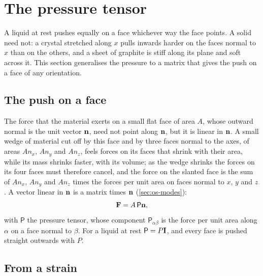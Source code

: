 \section{The pressure tensor}
\label{sec:pr-tensor}

A liquid at rest pushes equally on a face whichever way the face points.
A solid need not: a crystal stretched along $x$ pulls inwards harder on
the faces normal to $x$ than on the others, and a sheet of graphite is
stiff along its plane and soft across it. This section generalises the
pressure to a matrix that gives the push on a face of any orientation.

\subsection*{The push on a face}

The force that the material exerts on a small flat face of area $A$,
whose outward normal is the unit vector $\bm{\mathrm{n}}$, need not point along
$\bm{\mathrm{n}}$, but it is linear in $\bm{\mathrm{n}}$. A small wedge of material cut off
by this face and by three faces normal to the axes, of areas $An_x$,
$An_y$ and $An_z$, feels forces on its faces that shrink with their area,
while its mass shrinks faster, with its volume; as the wedge shrinks the
forces on its four faces must therefore cancel, and the force on the
slanted face is the sum of $An_x$, $An_y$ and $An_z$ times the forces per
unit area on faces normal to $x$, $y$ and $z$. A vector linear in $\bm{\mathrm{n}}$
is a matrix times $\bm{\mathrm{n}}$ (\cref{sec:os-modes}):
\begin{equation*}
   \bm{\mathrm{F}} = A\,\mathsf{P}\bm{\mathrm{n}} ,
\end{equation*}
with $\mathsf{P}$ the pressure tensor, whose component
$\mathsf{P}_{\alpha\beta}$ is the force per unit area along $\alpha$ on a
face normal to $\beta$. For a liquid at rest $\mathsf{P} = P\bm{\mathrm{I}}$, and
every face is pushed straight outwards with $P$.

\subsection*{From a strain}

